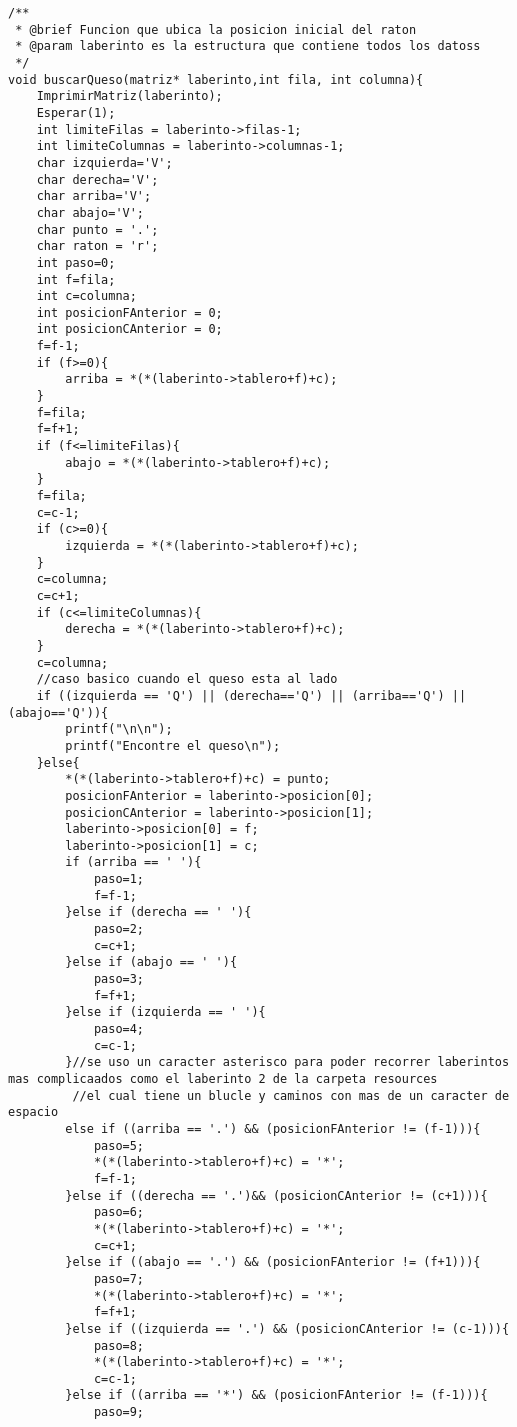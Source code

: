 \begin{verbatim}
/**
 * @brief Funcion que ubica la posicion inicial del raton
 * @param laberinto es la estructura que contiene todos los datoss
 */
void buscarQueso(matriz* laberinto,int fila, int columna){
    ImprimirMatriz(laberinto);
    Esperar(1);
    int limiteFilas = laberinto->filas-1;
    int limiteColumnas = laberinto->columnas-1;
    char izquierda='V';
    char derecha='V';
    char arriba='V';
    char abajo='V';
    char punto = '.';
    char raton = 'r';
    int paso=0;
    int f=fila;
    int c=columna;
    int posicionFAnterior = 0;
    int posicionCAnterior = 0;
    f=f-1;
    if (f>=0){
        arriba = *(*(laberinto->tablero+f)+c);
    }
    f=fila;
    f=f+1;
    if (f<=limiteFilas){
        abajo = *(*(laberinto->tablero+f)+c);
    }
    f=fila;
    c=c-1;
    if (c>=0){
        izquierda = *(*(laberinto->tablero+f)+c);
    }
    c=columna;
    c=c+1;
    if (c<=limiteColumnas){
        derecha = *(*(laberinto->tablero+f)+c);
    }
    c=columna;
    //caso basico cuando el queso esta al lado
    if ((izquierda == 'Q') || (derecha=='Q') || (arriba=='Q') || (abajo=='Q')){
        printf("\n\n");
        printf("Encontre el queso\n");
    }else{
        *(*(laberinto->tablero+f)+c) = punto;
        posicionFAnterior = laberinto->posicion[0];
        posicionCAnterior = laberinto->posicion[1];
        laberinto->posicion[0] = f;
        laberinto->posicion[1] = c; 
        if (arriba == ' '){
            paso=1;
            f=f-1;
        }else if (derecha == ' '){
            paso=2;
            c=c+1;
        }else if (abajo == ' '){
            paso=3;
            f=f+1;
        }else if (izquierda == ' '){
            paso=4;
            c=c-1;
        }//se uso un caracter asterisco para poder recorrer laberintos mas complicaados como el laberinto 2 de la carpeta resources
         //el cual tiene un blucle y caminos con mas de un caracter de espacio
        else if ((arriba == '.') && (posicionFAnterior != (f-1))){
            paso=5;
            *(*(laberinto->tablero+f)+c) = '*';
            f=f-1;
        }else if ((derecha == '.')&& (posicionCAnterior != (c+1))){
            paso=6;
            *(*(laberinto->tablero+f)+c) = '*';
            c=c+1;
        }else if ((abajo == '.') && (posicionFAnterior != (f+1))){
            paso=7;
            *(*(laberinto->tablero+f)+c) = '*';
            f=f+1;
        }else if ((izquierda == '.') && (posicionCAnterior != (c-1))){
            paso=8;
            *(*(laberinto->tablero+f)+c) = '*';
            c=c-1;
        }else if ((arriba == '*') && (posicionFAnterior != (f-1))){
            paso=9;

\end{verbatim}
